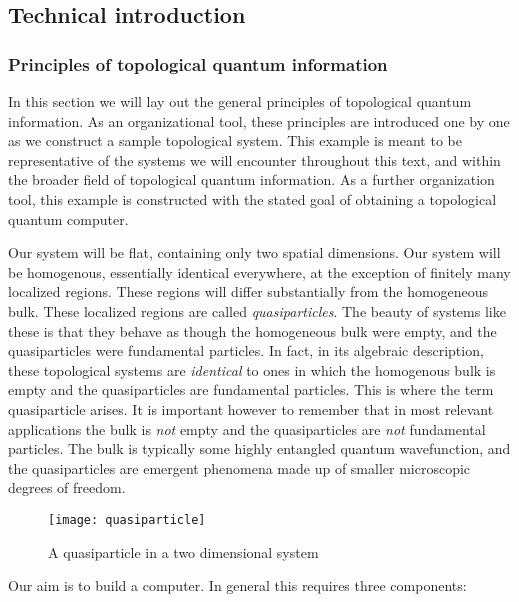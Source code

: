 \subsection{Technical introduction}
\label{technical-introduction}

\subsubsection{Principles of topological quantum information}
\label{principles-of-tqi}

In this section we will lay out the general principles of topological quantum information. As an organizational tool, these principles are introduced one by one as we construct a sample topological system. This example is meant to be representative of the systems we will encounter throughout this text, and within the broader field of topological quantum information. As a further organization tool, this example is constructed with the stated goal of obtaining a topological quantum computer.

Our system will be flat, containing only two spatial dimensions. Our system will be homogenous, essentially identical everywhere, at the exception of finitely many localized regions. These regions will differ substantially from the homogeneous bulk. These localized regions are called {\em quasiparticles}. The beauty of systems like these is that they behave as though the homogeneous bulk were empty, and the quasiparticles were fundamental particles. In fact, in its algebraic description, these topological systems are {\em identical} to ones in which the homogenous bulk is empty and the quasiparticles are fundamental particles. This is where the term quasiparticle arises. It is important however to remember that in most relevant applications the bulk is {\em not} empty and the quasiparticles are {\em not} fundamental particles. The bulk is typically some highly entangled quantum wavefunction, and the quasiparticles are emergent phenomena made up of smaller microscopic degrees of freedom.

\begin{figure}[h]
\begin{center}
\texttt{[image: quasiparticle]}
\end{center}
\caption{A quasiparticle in a two dimensional system}
\end{figure}

Our aim is to build a computer. In general this requires three components:

